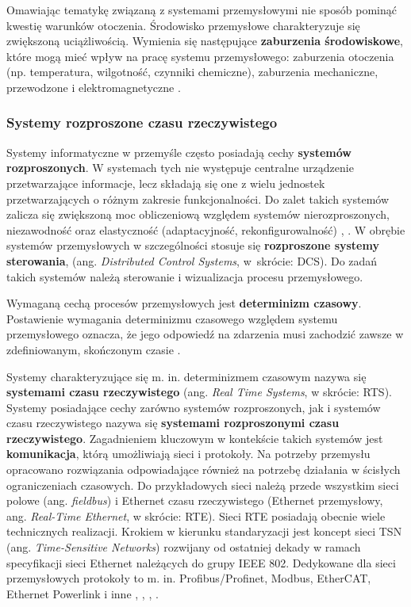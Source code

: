 \documentclass[a4paper, 12pt, twoside]{article}
\begin{document}
Omawiając tematykę związaną z systemami przemysłowymi nie sposób pominąć kwestię
warunków otoczenia. Środowisko przemysłowe charakteryzuje się zwiększoną uciążliwością.
Wymienia się następujące \textbf{zaburzenia środowiskowe}, które mogą mieć wpływ na pracę
systemu przemysłowego: zaburzenia otoczenia (np. temperatura, wilgotność, czynniki chemiczne),
zaburzenia mechaniczne, przewodzone i elektromagnetyczne \cite{isp}.

\subsubsection{Systemy rozproszone czasu rzeczywistego}

Systemy informatyczne w przemyśle często posiadają cechy \textbf{systemów rozproszonych}.
W systemach tych nie występuje centralne urządzenie
przetwarzające informacje, lecz składają się one z wielu jednostek
przetwarzających o różnym zakresie funkcjonalności. Do zalet
takich systemów zalicza się zwiększoną moc obliczeniową względem systemów nierozproszonych,
niezawodność oraz elastyczność (adaptacyjność, rekonfigurowalność)
\cite{isp},
\cite{isp-analiza-przepływu-informacji}. W obrębie systemów przemysłowych
w szczególności stosuje się \textbf{rozproszone systemy sterowania},
(ang. \emph{Distributed Control Systems}, w~skrócie: DCS). Do zadań takich systemów
należą sterowanie i wizualizacja procesu przemysłowego.

Wymaganą cechą procesów przemysłowych jest \textbf{determinizm czasowy}.
Postawienie wymagania determinizmu czasowego względem systemu przemysłowego oznacza,
że jego odpowiedź na zdarzenia musi zachodzić zawsze w zdefiniowanym, skończonym czasie
\cite{isp}.

Systemy charakteryzujące się m. in. determinizmem czasowym nazywa się
\textbf{systemami czasu rzeczywistego} (ang. \emph{Real Time Systems}, w skrócie: RTS).
Systemy posiadające cechy zarówno systemów rozproszonych, jak i systemów
czasu rzeczywistego nazywa się \textbf{systemami rozproszonymi czasu rzeczywistego}.
Zagadnieniem kluczowym w kontekście takich systemów
jest \textbf{komunikacja}, którą umożliwiają sieci i protokoły.
Na potrzeby przemysłu opracowano rozwiązania odpowiadające również na potrzebę
działania w ścisłych ograniczeniach czasowych. Do przykładowych sieci należą przede wszystkim
sieci polowe (ang. \emph{fieldbus}) i Ethernet czasu rzeczywistego (Ethernet przemysłowy, ang. \emph{Real-Time Ethernet}, w skrócie: RTE).
Sieci RTE posiadają obecnie wiele technicznych realizacji. Krokiem w kierunku
standaryzacji  jest koncept sieci TSN (ang. \emph{Time-Sensitive Networks})
rozwijany od ostatniej dekady w ramach specyfikacji sieci Ethernet należących do grupy IEEE 802.
Dedykowane dla sieci przemysłowych protokoły to m. in. Profibus/Profinet,
Modbus, EtherCAT, Ethernet Powerlink i inne \cite{isp}, \cite{isp-analiza-przepływu-informacji},
\cite{tsn-for-dummies}, \cite{rte-standards-and-impl}.
\end{document}
